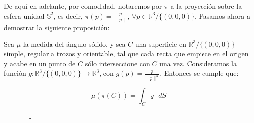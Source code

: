 De aquí en adelante, por comodidad, notaremos por $\pi$ a la proyección sobre la esfera unidad $\mathds{S}^2$, es decir, $\pi(p)=\frac{p}{\|p\|}$, $\forall p \in \mathds{R}^3/\{(0,0,0)\}$. Pasamos ahora a demostrar la siguiente proposición:

\begin{proposicion}\label{angSolido1}
  Sea $\mu$ la medida del ángulo sólido, y sea $C$ una superficie en $\mathds{R}^3/\{(0,0,0)\}$ simple, regular a trozos y orientable, tal que cada recta que empiece en el origen y acabe en un punto de $C$ sólo interseccione con $C$ una vez. Consideramos la función $g:\mathds{R}^3/\{(0,0,0)\} \rightarrow \mathds{R}^3$, con $g(p)=\frac{p}{\|p\|^3}$. Entonces se cumple que:

 \begin{equation}
 \mu (\pi(C)) = \int _C g \text{ }dS 
 \end{equation}
 
\end{proposicion}

\begin{figure}[h]
  \lineskip=-\fboxrule
\end{figure}


